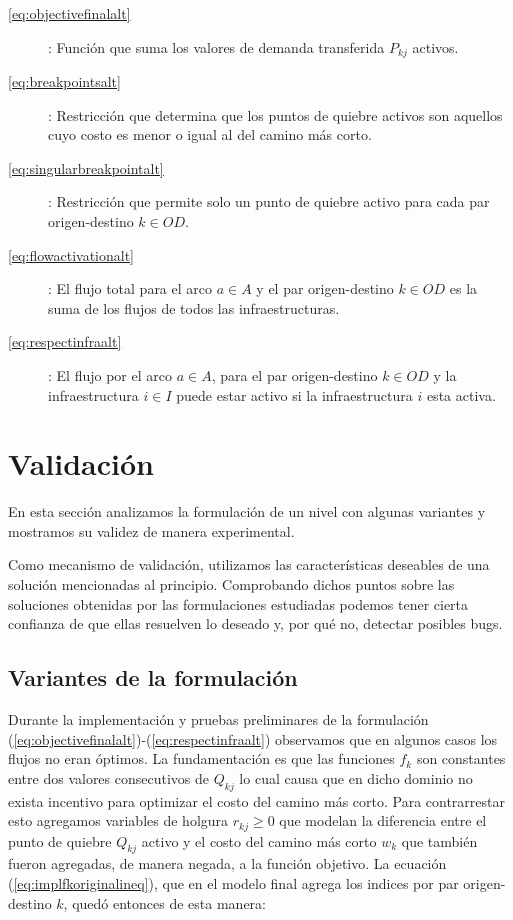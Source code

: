 \documentclass{article}
\begin{document}
  \begin{description}
    \item[\ref{eq:objectivefinalalt}]: Función que suma los valores de demanda transferida $P_{kj}$ activos.
    \item[\ref{eq:breakpointsalt}]: Restricción que determina que los puntos de quiebre activos son aquellos cuyo costo es menor o igual al del camino más corto.
    \item[\ref{eq:singularbreakpointalt}]: Restricción que permite solo un punto de quiebre activo para cada par origen-destino $k \in OD$.
    \item[\ref{eq:flowactivationalt}]: El flujo total para el arco $a \in A$ y el par origen-destino $k \in OD$ es la suma de los flujos de todos las infraestructuras.
    \item[\ref{eq:respectinfraalt}]: El flujo por el arco $a \in A$, para el par origen-destino $k \in OD$ y la infraestructura $i \in I$ puede estar activo si la infraestructura $i$ esta activa.
  \end{description}

  \section{Validación}

  En esta sección analizamos la formulación de un nivel con algunas variantes y mostramos su validez de manera experimental.

  Como mecanismo de validación, utilizamos las características deseables de una solución mencionadas al principio. Comprobando dichos puntos sobre las soluciones obtenidas por las formulaciones estudiadas podemos tener cierta confianza de que ellas resuelven lo deseado y, por qué no, detectar posibles bugs.

  \subsection{Variantes de la formulación}

  Durante la implementación y pruebas preliminares de la formulación (\ref{eq:objectivefinalalt})-(\ref{eq:respectinfraalt}) observamos que en algunos casos los flujos no eran óptimos. La fundamentación es que las funciones $f_k$ son constantes entre dos valores consecutivos de $Q_{kj}$ lo cual causa que en dicho dominio no exista incentivo para optimizar el costo del camino más corto. Para contrarrestar esto agregamos variables de holgura $r_{kj} \geq 0$ que modelan la diferencia entre el punto de quiebre $Q_{kj}$ activo y el costo del camino más corto $w_k$ que también fueron agregadas, de manera negada, a la función objetivo. La ecuación (\ref{eq:implfkoriginalineq}), que en el modelo final agrega los indices por par origen-destino $k$, quedó entonces de esta manera:
\end{document}
